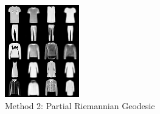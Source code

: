 \documentclass{article}
\begin{document}
\begin{figure}[!p]
\begin{subfigure}[b]{0.32\textwidth}
        \includegraphics[width=\linewidth]{images/fashion_vanilla_geodesic_comparison_grid.png}
        \caption{Method 2: Partial Riemannian Geodesic}
        \label{fig:partial_recon}
    \end{subfigure}
    \hfill
    \begin{subfigure}[b]{0.32\textwidth}

\end{subfigure}
\end{figure}
\end{document}
